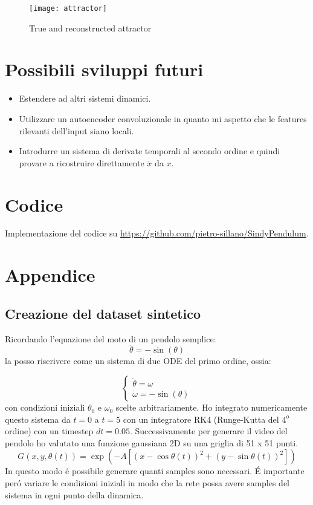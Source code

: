\documentclass[11pt]{article}
\begin{document}
\begin{figure}[h]
\centering
\texttt{[image: attractor]}
\caption{True and reconstructed attractor}
\end{figure}

\section{Possibili sviluppi futuri}

\begin{itemize}
	\item Estendere ad altri sistemi dinamici.
	\item Utilizzare un autoencoder convoluzionale in quanto mi aspetto che le features rilevanti dell'input siano locali.
	\item Introdurre un sistema di derivate temporali al secondo ordine e  quindi provare a ricostruire direttamente $\ddot{x}$ da  $x$.
\end{itemize}





\section{Codice}
Implementazione del codice su 
\url{https://github.com/pietro-sillano/SindyPendulum}.
\newpage
\section{Appendice}
\subsection{Creazione del dataset sintetico}
Ricordando l'equazione del moto di un pendolo semplice:
$$ \ddot{\theta} = - \sin(\theta) $$
la posso riscrivere come un sistema di due ODE del primo ordine, ossia:

$$
\begin{cases} 
\dot{\theta} = \omega \\ 
\dot{\omega} = - \sin(\theta)
\end{cases}
$$
con condizioni iniziali $\theta_0$ e $\omega_0$ scelte arbitrariamente.
Ho integrato numericamente questo sistema da $t=0$ a $t=5$ con un integratore RK4 (Runge-Kutta del $4^o$ ordine) con un timestep  $dt = 0.05$.
Successivamente per generare il video del pendolo ho valutato una funzione gaussiana 2D su una griglia di 51 x 51 punti.
$$G(x,y,\theta(t)) = \exp(-A[(x - \cos{\theta(t)})^2 + (y - \sin{\theta(t)})^2])$$
In questo modo é possibile generare quanti samples sono necessari.
É importante peró variare le condizioni iniziali in modo che la rete possa avere samples del sistema in ogni punto della dinamica.
\end{document}
